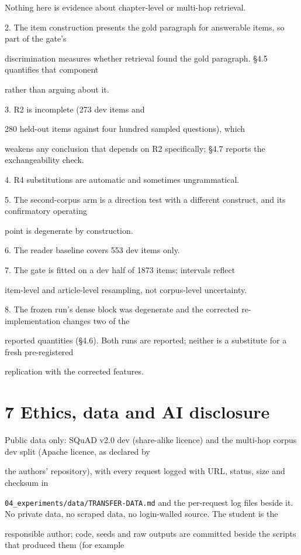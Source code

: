 Nothing here is evidence about chapter-level or multi-hop retrieval.

2. The item construction presents the gold paragraph for answerable items, so part of the gate's

discrimination measures whether retrieval found the gold paragraph. §4.5 quantifies that component

rather than arguing about it.

3. R2 is incomplete (273 dev items and

280 held-out items against four hundred sampled questions), which

weakens any conclusion that depends on R2 specifically; §4.7 reports the exchangeability check.

4. R4 substitutions are automatic and sometimes ungrammatical.

5. The second-corpus arm is a direction test with a different construct, and its confirmatory operating

point is degenerate by construction.

6. The reader baseline covers 553 dev items only.

7. The gate is fitted on a dev half of 1873 items; intervals reflect

item-level and article-level resampling, not corpus-level uncertainty.

8. The frozen run's dense block was degenerate and the corrected re-implementation changes two of the

reported quantities (§4.6). Both runs are reported; neither is a substitute for a fresh pre-registered

replication with the corrected features.

\section{7 Ethics, data and AI disclosure}
Public data only: SQuAD v2.0 dev (share-alike licence) and the multi-hop corpus dev split (Apache licence, as declared by

the authors' repository), with every request logged with URL, status, size and checksum in

\texttt{04\_experiments/\allowbreak{}data/\allowbreak{}TRANSFER-DATA.md} and the per-request log files beside it. No private data, no scraped data, no login-walled source. The student is the

responsible author; code, seeds and raw outputs are committed beside the scripts that produced them (for example

